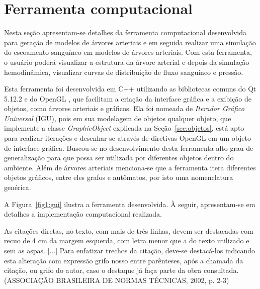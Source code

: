 \documentclass[
        english,			
        brazil			        %
        ,<...>]{abntbibufjf}
\begin{document}
\chapter{Ferramenta computacional}\label{sec:modelagem}

Nesta seção apresentam-se detalhes da ferramenta computacional desenvolvida para geração de modelos de árvores arteriais e em seguida realizar uma simulação do escoamento sanguíneo em modelos de árvores arteriais. Com esta ferramenta, o usuário poderá  visualizar a estrutura da árvore arterial e depois da simulação hemodinâmica, visualizar curvas de distribuição de fluxo sanguíneo e pressão.

Esta ferramenta foi desenvolvida em C++ utilizando as bibliotecas comuns do Qt 5.12.2 \cite{QTClasses} e do OpenGL \cite{OpenGL}, que facilitam a criação da interface gráfica e a exibição de objetos, como árvores arteriais e gráficos. Ela foi nomeada de \textit{Iterador Gráfico Universal} (IGU), pois em sua modelagem de objetos qualquer objeto, que implemente a classe \textit{GraphicObject} explicada na Seção~\ref{sec:objetos}, está apto para realizar iterações e desenhar-se através de diretivas OpenGL em um objeto de interface gráfica. Buscou-se no desenvolvimento desta ferramenta alto grau de generalização para que possa ser utilizada por diferentes objetos dentro do ambiente. Além de árvores arteriais menciona-se que a ferramenta itera diferentes objetos gráficos, entre eles grafos e autômatos, por isto uma nomenclatura genérica.

A Figura~\ref{fig1:gui} ilustra a ferramenta desenvolvida. À seguir, apresentam-se em detalhes a implementação computacional realizada.



\begin{citacao}
As cita\c{c}\~oes diretas, no texto, com mais de tr\^es linhas, devem ser destacadas 
com recuo de 4 cm da margem esquerda, com letra menor que a do texto utilizado 
e sem as aspas. [...] Para enfatizar trechos da cita\c{c}\~ao, deve-se destac\'a-los indicando esta 
altera\c{c}\~ao com express\~ao grifo nosso entre par\^enteses, ap\'os a chamada da cita\c{c}\~ao, ou grifo 
do autor, caso o destaque j\'a fa\c{c}a parte da obra consultada. (ASSOCIA\c{C}\~AO BRASILEIRA DE NORMAS 
T\'ECNICAS, 2002, p. 2-3)
\end{citacao}

\end{document}
